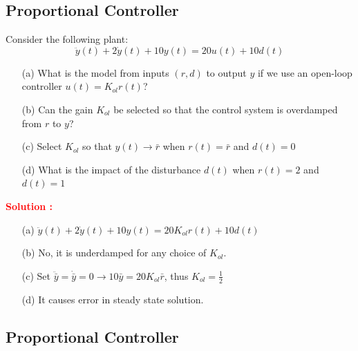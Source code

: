 \documentclass[12pt]{article}
\begin{document}
\clearpage
\subsection{Proportional Controller}

Consider the following plant:
\begin{equation}
    \ddot{y}(t) + 2 \dot{y}(t) + 10 y(t) = 20 u(t) + 10 d(t)
\end{equation}
\begin{itemize}
    \item[(a)] What is the model from inputs \((r,d)\) to output \(y\) if we use an open-loop controller \(u(t) = K_{ol}r(t)\)?
    \item[(b)] Can the gain \(K_{ol}\) be selected so that the control system is overdamped from \(r\) to \(y\)?
    \item[(c)] Select \(K_{ol}\) so that \(y(t) \rightarrow \bar{r}\) when \(r(t) = \bar{r}\) and \(d(t) = 0\)
    \item[(d)] What is the impact of the disturbance \(d(t)\) when \(r(t) = 2\) and \(d(t) = 1\)
\end{itemize}
\textbf{\textcolor{red}{Solution :}} 
\begin{itemize}
    \item[(a)] $ \ddot{y}(t) + 2 \dot{y}(t) + 10 y(t) = 20 K_{ol}r(t) + 10 d(t)$
    \item[(b)] No, it is underdamped for any choice of \(K_{ol}\).
    \item[(c)] Set \(\ddot{\bar{y}} = \dot{\bar{y}} = 0 \rightarrow 10 \bar{y} = 20 K_{ol} \bar{r}\), thus \(K_{ol} = \frac{1}{2}\)
    \item[(d)] It causes error in steady state solution.
\end{itemize}

\clearpage
\subsection{Proportional Controller}
\end{document}
